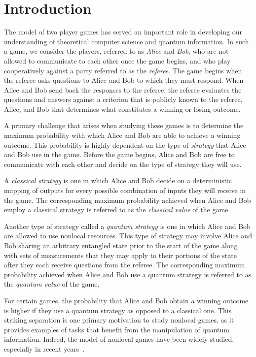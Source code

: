 \chapter{Introduction}
\label{chap:introduction}

The model of two player games has served an important role in developing our understanding of theoretical computer science and quantum information. In such a game, we consider the players, referred to as \emph{Alice} and \emph{Bob}, who are not allowed to communicate to each other once the game begins, and who play cooperatively against a party referred to as the \emph{referee}. The game begins when the referee asks questions to Alice and Bob to which they must respond. When Alice and Bob send back the responses to the referee, the referee evaluates the questions and answers against a criterion that is publicly known to the referee, Alice, and Bob that determines what constitutes a winning or losing outcome. 

A primary challenge that arises when studying these games is to determine the maximum probability with which Alice and Bob are able to achieve a winning outcome. This probability is highly dependent on the type of \emph{strategy} that Alice and Bob use in the game. Before the game begins, Alice and Bob are free to communicate with each other and decide on the type of strategy they will use. 

A \emph{classical strategy} is one in which Alice and Bob decide on a deterministic mapping of outputs for every possible combination of inputs they will receive in the game. The corresponding maximum probability achieved when Alice and Bob employ a classical strategy is referred to as the \emph{classical value} of the game. 

Another type of strategy called a \emph{quantum strategy} is one in which Alice and Bob are allowed to use nonlocal resources. This type of strategy may involve Alice and Bob sharing an arbitrary entangled state prior to the start of the game along with sets of measurements that they may apply to their portions of the state after they each receive questions from the referee. The corresponding maximum probability achieved when Alice and Bob use a quantum strategy is referred to as the \emph{quantum value} of the game. 

For certain games, the probability that Alice and Bob obtain a winning outcome is higher if they use a quantum strategy as opposed to a classical one. This striking separation is one primary motivation to study nonlocal games, as it provides examples of tasks that benefit from the manipulation of quantum information. Indeed, the model of nonlocal games have been widely studied, especially in recent years~\cite{Cleve2004, Brassard2005, Cleve2008, Doherty2008,Kempe2010,Kempe2010a,Kempe2011,Junge2011a,Buhrman2013,
Regev2013,Dinur2013,Vidick2013,Cleve2014}. 

